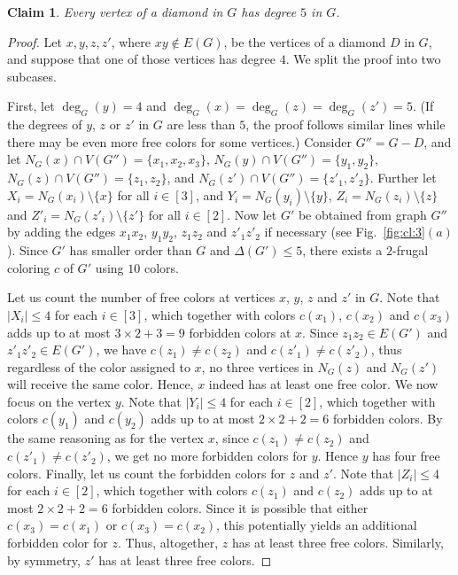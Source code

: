\documentclass[10pt,a4paper]{article}
\newtheorem{claim}{Claim}
\begin{document}
\begin{claim} \label{cl:3}
Every vertex of a diamond in $G$ has degree $5$ in $G$.
\end{claim} 
\begin{proof}
Let $x,y,z,z'$, where $xy \notin E(G)$, be the vertices of a diamond $D$ in $G$, and suppose that one of those vertices has degree $4$. We split the proof into two subcases.

First, let $\deg_G(y)=4$ and $\deg_G(x)=\deg_G(z)=\deg_G(z')=5$. (If the degrees of $y$, $z$ or $z'$ in $G$ are less than $5$, the proof follows similar lines while there may be even more free colors for some vertices.) Consider $G''=G-D$, and let $N_G(x) \cap V(G'')=\{x_1,x_2,x_3\}$, $N_G(y) \cap V(G'')=\{y_1,y_2\}$, $N_G(z) \cap V(G'')=\{z_1,z_2\}$, and $N_G(z') \cap V(G'')=\{z'_1,z'_2\}$. Further let $X_i=N_G(x_i)\setminus \{x\}$ for all $i\in[3]$, and $Y_i=N_G(y_i)\setminus \{y\}$, $Z_i=N_G(z_i)\setminus \{z\}$ and $Z'_i=N_G(z'_i)\setminus \{z'\}$ for all $i \in [2]$. Now let $G'$ be obtained from graph $G''$ by adding the edges $x_1x_2$, $y_1y_2$, $z_1z_2$ and $z'_1z'_2$ if necessary (see Fig.~\ref{fig:cl:3}$(a)$). Since $G'$ has smaller order than $G$ and $\Delta(G')\le 5$, there exists a $2$-frugal coloring $c$ of $G'$ using $10$ colors.

Let us count the number of free colors at vertices $x$, $y$, $z$ and $z'$ in $G$. Note that $|X_i| \le 4$ for each $i\in [3]$, which together with colors $c(x_1)$, $c(x_2)$ and $c(x_3)$ adds up to at most $3 \times 2 + 3=9$ forbidden colors at $x$. Since $z_1z_2 \in E(G')$ and $z'_1z'_2 \in E(G')$, we have $c(z_1) \ne c(z_2)$ and $c(z'_1) \ne c(z'_2)$, thus regardless of the color assigned to $x$, no three vertices in $N_G(z)$ and $N_G(z')$ will receive the same color. Hence, $x$ indeed has at least one free color. We now focus on the vertex $y$. Note that $|Y_i| \le 4$ for each $i\in [2]$, which together with colors $c(y_1)$ and $c(y_2)$ adds up to at most $2 \times 2 +2=6$ forbidden colors. By the same reasoning as for the vertex $x$, since $c(z_1) \ne c(z_2)$ and $c(z'_1) \ne c(z'_2)$, we get no more forbidden colors for $y$. Hence $y$ has four free colors. Finally, let us count the forbidden colors for $z$ and $z'$. Note that $|Z_i| \le 4$ for each $i\in [2]$, which together with colors $c(z_1)$ and $c(z_2)$ adds up to at most $2 \times 2 +2=6$ forbidden colors. Since it is possible that either $c(x_3)=c(x_1)$ or $c(x_3)=c(x_2)$, this potentially yields an additional forbidden color for $z$. Thus, altogether, $z$ has at least three free colors. Similarly, by symmetry, $z'$ has at least three free colors.


\end{proof}
\end{document}
